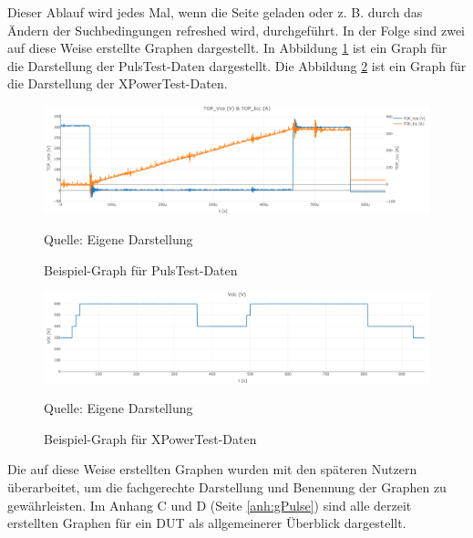 Dieser Ablauf wird jedes Mal, wenn die Seite geladen oder z. B. durch das Ändern der Suchbedingungen refreshed wird, durchgeführt.
In der Folge sind zwei auf diese Weise erstellte Graphen dargestellt.
In Abbildung \ref{fig:Beispiel-Graph für PulsTest-Daten} ist ein Graph für die Darstellung der PulsTest-Daten dargestellt.
Die Abbildung \ref{fig:Beispiel-Graph für XPowerTest-Daten} ist ein Graph für die Darstellung der XPowerTest-Daten.

\begin{figure}[H]
    \centering
    \includegraphics[width=1\textwidth]{Grafiken/newplot.png}
    \caption{Beispiel-Graph für PulsTest-Daten}
    \label{fig:Beispiel-Graph für PulsTest-Daten}
    {Quelle: Eigene Darstellung}
\end{figure}

\begin{figure}[H]
    \centering
    \includegraphics[width=1\textwidth]{Grafiken/newplot (1).png}
    \caption{Beispiel-Graph für XPowerTest-Daten}
    \label{fig:Beispiel-Graph für XPowerTest-Daten}
    {Quelle: Eigene Darstellung}
\end{figure}

Die auf diese Weise erstellten Graphen wurden mit den späteren Nutzern überarbeitet, um die fachgerechte Darstellung und Benennung der Graphen zu gewährleisten.
Im Anhang C und D (Seite \ref{anh:gPulse}) sind alle derzeit erstellten Graphen für ein \ac{DUT} als allgemeinerer Überblick dargestellt.
